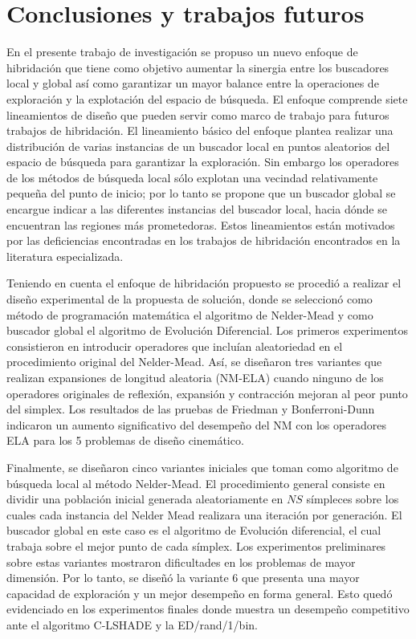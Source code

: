\chapter{Conclusiones y trabajos futuros} \label{Chapter8}
En el presente trabajo de investigación se propuso un nuevo enfoque de hibridación que tiene como objetivo aumentar la sinergia entre los buscadores local y global así como garantizar un mayor balance entre la operaciones de exploración y la explotación del espacio de búsqueda. El enfoque comprende siete lineamientos de diseño que pueden servir como marco de trabajo para futuros trabajos de hibridación. El lineamiento básico del enfoque plantea realizar una distribución de varias instancias de un buscador local en puntos aleatorios del espacio de búsqueda para garantizar la exploración. Sin embargo los operadores de los métodos de búsqueda local sólo explotan una vecindad relativamente pequeña del punto de inicio; por lo tanto se propone que un buscador global se encargue indicar a las diferentes instancias del buscador local, hacia dónde se encuentran las regiones más prometedoras. Estos lineamientos están motivados por las deficiencias encontradas en los trabajos de hibridación encontrados en la literatura especializada.

Teniendo en cuenta el enfoque de hibridación propuesto se procedió a realizar el diseño experimental de la propuesta de solución, donde se seleccionó como método de programación matemática el algoritmo de Nelder-Mead y como buscador global el algoritmo de Evolución Diferencial. Los primeros experimentos consistieron en introducir operadores que incluían aleatoriedad en el procedimiento original del Nelder-Mead. Así, se diseñaron tres variantes que realizan expansiones de longitud aleatoria (NM-ELA) cuando ninguno de los operadores originales de reflexión, expansión y contracción mejoran al peor punto del simplex. Los resultados de las pruebas de Friedman y Bonferroni-Dunn indicaron un aumento significativo del desempeño del NM con los operadores ELA para los 5 problemas de diseño cinemático. 

Finalmente, se diseñaron cinco variantes iniciales que toman como algoritmo de búsqueda local al método Nelder-Mead. El procedimiento general consiste en dividir una población inicial generada aleatoriamente en $NS$ símpleces sobre los cuales cada instancia del Nelder Mead realizara una iteración por generación. El buscador global en este caso es el algoritmo de Evolución diferencial, el cual trabaja sobre el mejor punto de cada símplex. Los experimentos preliminares sobre estas variantes mostraron dificultades en los problemas de mayor dimensión. Por lo tanto, se diseñó la variante 6 que presenta una mayor capacidad de exploración y un mejor desempeño en forma general. Esto quedó evidenciado en los experimentos finales donde muestra un desempeño competitivo ante el algoritmo C-LSHADE y la ED/rand/1/bin.


